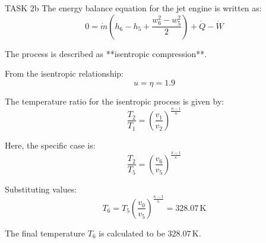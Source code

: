 TASK 2b  
The energy balance equation for the jet engine is written as:  
\[
0 = \dot{m} \left( h_6 - h_5 + \frac{w_6^2 - w_5^2}{2} \right) + \dot{Q} - \dot{W}
\]  

The process is described as **isentropic compression**.  

From the isentropic relationship:  
\[
u = \eta = 1.9
\]  

The temperature ratio for the isentropic process is given by:  
\[
\frac{T_2}{T_1} = \left( \frac{v_1}{v_2} \right)^{\frac{n-1}{n}}
\]  

Here, the specific case is:  
\[
\frac{T_2}{T_5} = \left( \frac{v_6}{v_5} \right)^{\frac{\kappa-1}{\kappa}}
\]  

Substituting values:  
\[
T_6 = T_5 \left( \frac{v_0}{v_5} \right)^{\frac{\kappa-1}{\kappa}} = 328.07 \, \text{K}
\]  

The final temperature \( T_6 \) is calculated to be \( 328.07 \, \text{K} \).